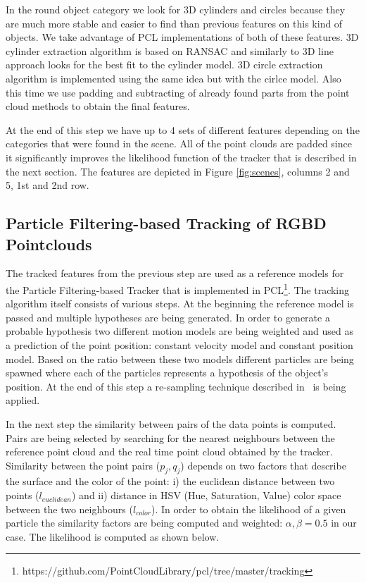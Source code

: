 In the round object category we look for 3D cylinders and circles because they are much more stable and easier to find than previous features on this kind of objects. We take advantage of PCL implementations of both of these features. 3D cylinder extraction algorithm is based on RANSAC and similarly to 3D line approach looks for the best fit to the cylinder model. 3D circle extraction algorithm is implemented using the same idea but with the cirlce model. Also this time we use padding and subtracting of already found parts from the point cloud methods to obtain the final features. 

At the end of this step we have up to 4 sets of different features depending on the categories that were found in the scene. All of the point clouds are padded since it significantly improves the likelihood function of the tracker that is described in the next section. The features are depicted in Figure \ref{fig:scenes}, columns 2 and 5, 1st and 2nd row. 




\subsection{Particle Filtering-based Tracking of RGBD Pointclouds}
\label{sec:tracking}
The tracked features from the previous step are used as a reference models for the Particle Filtering-based Tracker that is implemented in PCL\footnote{https://github.com/PointCloudLibrary/pcl/tree/master/tracking}. The tracking algorithm itself consists of various steps. At the beginning the reference model is passed and multiple hypotheses are being generated. In order to generate a probable hypothesis two different motion models are being weighted and used as a prediction of the point position: constant velocity model and constant position model. Based on the ratio between these two models different particles are being spawned where each of the particles represents a hypothesis of the object's position. At the end of this step a re-sampling technique described in~\cite{Walker} is being applied. 

In the next step the similarity between pairs of the data points is computed. Pairs are being selected by searching for the nearest neighbours between the reference point cloud and the real time point cloud obtained by the tracker. Similarity between the point pairs ($p_{j},q_{j}$) depends on two factors that describe the surface and the color of the point: i) the euclidean distance between two points ($l_{euclidean}$) and ii) distance in HSV (Hue, Saturation, Value) color space between the two neighbours ($l_{color}$). In order to obtain the likelihood of a given particle the similarity factors are being computed and weighted: $\alpha, \beta = 0.5$ in our case. The likelihood is computed as shown below.

